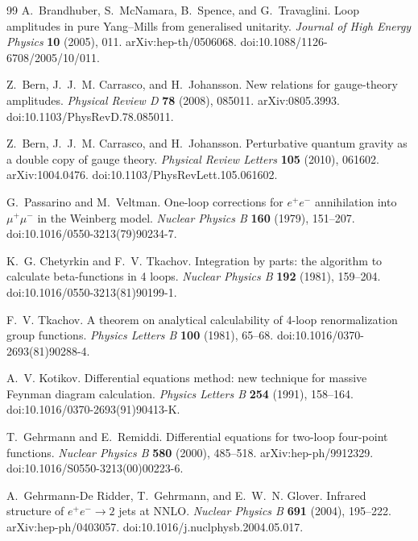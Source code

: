 \begin{thebibliography}{99}
A.~Brandhuber, S.~McNamara, B.~Spence, and G.~Travaglini.
Loop amplitudes in pure Yang--Mills from generalised unitarity.
\emph{Journal of High Energy Physics} \textbf{10} (2005), 011.
arXiv:hep-th/0506068.
doi:10.1088/1126-6708/2005/10/011.

Z.~Bern, J.~J.~M. Carrasco, and H.~Johansson.
New relations for gauge-theory amplitudes.
\emph{Physical Review D} \textbf{78} (2008), 085011.
arXiv:0805.3993.
doi:10.1103/PhysRevD.78.085011.

Z.~Bern, J.~J.~M. Carrasco, and H.~Johansson.
Perturbative quantum gravity as a double copy of gauge theory.
\emph{Physical Review Letters} \textbf{105} (2010), 061602.
arXiv:1004.0476.
doi:10.1103/PhysRevLett.105.061602.

G.~Passarino and M.~Veltman.
One-loop corrections for \(e^+e^-\) annihilation into \(\mu^+\mu^-\) in the
Weinberg model.
\emph{Nuclear Physics B} \textbf{160} (1979), 151--207.
doi:10.1016/0550-3213(79)90234-7.

K.~G. Chetyrkin and F.~V. Tkachov.
Integration by parts: the algorithm to calculate beta-functions in 4 loops.
\emph{Nuclear Physics B} \textbf{192} (1981), 159--204.
doi:10.1016/0550-3213(81)90199-1.

F.~V. Tkachov.
A theorem on analytical calculability of 4-loop renormalization group
functions.
\emph{Physics Letters B} \textbf{100} (1981), 65--68.
doi:10.1016/0370-2693(81)90288-4.

A.~V. Kotikov.
Differential equations method: new technique for massive Feynman diagram
calculation.
\emph{Physics Letters B} \textbf{254} (1991), 158--164.
doi:10.1016/0370-2693(91)90413-K.

T.~Gehrmann and E.~Remiddi.
Differential equations for two-loop four-point functions.
\emph{Nuclear Physics B} \textbf{580} (2000), 485--518.
arXiv:hep-ph/9912329.
doi:10.1016/S0550-3213(00)00223-6.

A.~Gehrmann-De Ridder, T.~Gehrmann, and E.~W.~N. Glover.
Infrared structure of \(e^+e^-\to 2\) jets at NNLO.
\emph{Nuclear Physics B} \textbf{691} (2004), 195--222.
arXiv:hep-ph/0403057.
doi:10.1016/j.nuclphysb.2004.05.017.


\end{thebibliography}
